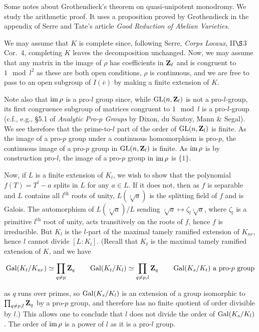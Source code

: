 \documentclass[deligne.tex]{subfiles}
\begin{document}
Some notes about Grothendieck's theorem on quasi-unipotent monodromy.
We study the arithmetic proof. It uses a proposition proved by
Grothendieck in the appendix of Serre and Tate's article
\textit{Good Reduction of Abelian Varieties}.

We may assume that $K$ is complete since, following Serre,
\textit{Corps Locaux}, II$\S$3 Cor.~4, completing $K$ leaves the 
decomposition unchanged. Now, we may assume that any matrix in the image of
$\rho$ has coefficients in $\mathbf{Z}_\ell$ and is congruent to $1\mod l^2$ as
these are both open conditions, $\rho$ is continuous, and we are free to pass 
to an open subgroup of $I(\overline v)$ by making a finite extension of $K$.

Note also that $\operatorname{im}\rho$ is a pro-$l$ group since, while $\operatorname{GL}(n,\mathbf{Z}_l)$ is
not a pro-$l$-group, its first congruence subgroup of matrices congruent to
$1\mod l$ is a pro-$l$-group (c.f., e.g., \S5.1 of \textit{Analytic Pro-$p$
Groups} by Dixon, du Sautoy, Mann \& Segal).
We see therefore that the prime-to-$l$ part of the order of $\operatorname{GL}(n,\mathbf{Z}_l)$
is finite. As the image of a pro-$p$ group under a continuous homomorphism 
is pro-$p$, the continuous image of a pro-$p$ group in $\operatorname{GL}(n,\mathbf{Z}_l)$ is 
finite. As $\operatorname{im}\rho$ is by construction pro-$l$, the image of a pro-$p$ group 
in $\operatorname{im}\rho$ is $\{1\}$.

Now, if $L$ is a finite extension of $K_l$, we wish to show that the 
polynomial $f(T)=T^l-a$ splits in $L$ for any $a\in L$. If it does not, then 
as $f$ is separable and $L$ contains all $l^\text{th}$ roots 
of unity, $L(\sqrt[l]a)$ is the splitting field of $f$ and is Galois.
The automorphism of $L(\sqrt[l]a)/L$ sending 
$\sqrt[l]a\mapsto \zeta_l\sqrt[l]a$, where $\zeta_l$ is a primitive
$l^{\text{th}}$ root of unity, acts transitively on the roots 
of $f$, hence $f$ is irreducible.
But $K_l$ is the $l$-part of the maximal
tamely ramified extension of $K_{nr}$, hence $l$ cannot divide $[L:K_l]$.
(Recall that $K_t$ is the maximal tamely ramified extension of $K$, and
we have
\begin{ceqn}\begin{equation*}
	\operatorname{Gal}(K_t/K_{nr})\simeq\prod_{q\ne p}\mathbf{Z}_q
	\qquad
	\operatorname{Gal}(K_t/K_l)\simeq\prod_{q\ne p,l}\mathbf{Z}_q
	\qquad
	\operatorname{Gal}(K_s/K_t)\text{ a pro-$p$ group}
\end{equation*}\end{ceqn}
as $q$ runs over primes, so $\operatorname{Gal}(K_s/K_l)$ is an extension
of a group isomorphic to $\prod_{q\ne p,l}\mathbf{Z}_q$ by a pro-$p$ group, and therefore has no finite quotient of order divisible by $l$.)
This allows one to conclude that $l$ does not divide the order of
$\operatorname{Gal}(K_s/K_l)$.
The order of $\operatorname{im}\rho$ is a power of $l$ as it is a pro-$l$ group.
\end{document}
